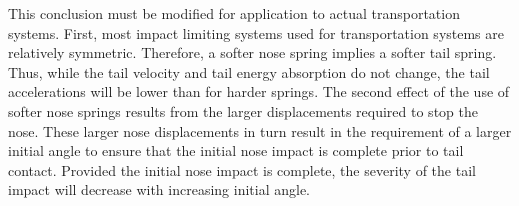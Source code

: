 This conclusion must be modified for
application to actual transportation systems.  First,
most impact limiting systems used for
transportation systems
are relatively symmetric.  Therefore, a softer
nose spring implies a softer tail spring.  Thus, 
while the tail velocity and tail energy absorption do not
change, the tail accelerations will be lower than for harder
springs.  The second effect of the use of softer nose springs results
from the larger displacements required to stop the nose.  These larger
nose displacements in turn result in the requirement of a larger
initial angle to ensure that the initial nose impact is complete prior
to tail contact.  Provided the initial nose impact is complete, the
severity of the tail impact will decrease with increasing 
initial angle. 
